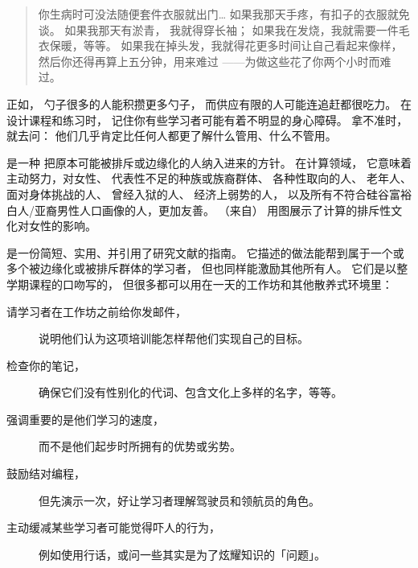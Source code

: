 \begin{quote}

  你生病时可没法随便套件衣服就出门{\ldots}
  如果我那天手疼，有扣子的衣服就免谈。
  如果我那天有淤青，
  我就得穿长袖；
  如果我在发烧，我就需要一件毛衣保暖，等等。
  如果我在掉头发，我就得花更多时间让自己看起来像样，
  然后你还得再算上五分钟，用来难过
  ——为做这些花了你两个小时而难过。

\end{quote}

正如，
勺子很多的人能积攒更多勺子，
而供应有限的人可能连追赶都很吃力。
在设计课程和练习时，
记住你有些学习者可能有着不明显的身心障碍。
拿不准时，就去问：
他们几乎肯定比任何人都更了解什么管用、什么不管用。


是一种
把原本可能被排斥或边缘化的人纳入进来的方针。
在计算领域，
它意味着主动努力，对女性、
代表性不足的种族或族裔群体、
各种性取向的人、
老年人、
面对身体挑战的人、
曾经入狱的人、
经济上弱势的人，
以及所有不符合硅谷富裕白人/亚裔男性人口画像的人，更加友善。
（来自）
用图展示了计算的排斥性文化对女性的影响。


\cite{Lee2017}是一份简短、实用、并引用了研究文献的指南。
它描述的做法能帮到属于一个或多个被边缘化或被排斥群体的学习者，
但也同样能激励其他所有人。
它们是以整学期课程的口吻写的，
但很多都可以用在一天的工作坊和其他散养式环境里：

\begin{description}

\item[请学习者在工作坊之前给你发邮件，]
  说明他们认为这项培训能怎样帮他们实现自己的目标。

\item[检查你的笔记，]
  确保它们没有性别化的代词、包含文化上多样的名字，等等。

\item[强调重要的是他们学习的速度，]
  而不是他们起步时所拥有的优势或劣势。

\item[鼓励结对编程，]
  但先演示一次，好让学习者理解驾驶员和领航员的角色。

\item[主动缓减某些学习者可能觉得吓人的行为，]
  例如使用行话，或问一些其实是为了炫耀知识的「问题」。

\end{description}

